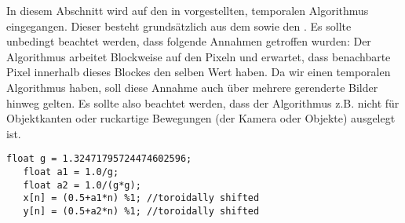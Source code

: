 In diesem Abschnitt wird auf den in \cite{hal02158423} vorgestellten, temporalen Algorithmus eingegangen.
Dieser besteht grundsätzlich aus dem  sowie den 
. Es sollte unbedingt beachtet werden, dass folgende
Annahmen getroffen wurden: Der Algorithmus arbeitet Blockweise auf den Pixeln und erwartet, dass benachbarte
Pixel innerhalb dieses Blockes den selben Wert haben. Da wir einen temporalen Algorithmus haben, soll diese Annahme 
auch über mehrere gerenderte Bilder hinweg gelten. Es sollte also beachtet werden, dass der Algorithmus z.B. nicht 
für Objektkanten oder ruckartige Bewegungen (der Kamera oder Objekte) ausgelegt ist.
\cite{heitz:hal-02150657}

\cite{quasirandomsequencesbyRoberts}
\label{code:golden_ratio}
\begin{lstlisting}[style=CStyle]
   float g = 1.32471795724474602596;
   float a1 = 1.0/g;
   float a2 = 1.0/(g*g);
   x[n] = (0.5+a1*n) %1; //toroidally shifted
   y[n] = (0.5+a2*n) %1; //toroidally shifted
\end{lstlisting}